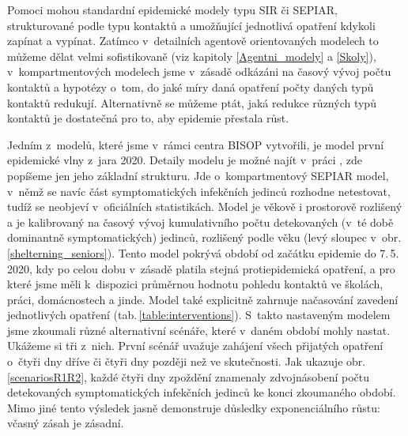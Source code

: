 Pomoci mohou standardní epidemické modely typu SIR či SEPIAR, strukturované podle typu kontaktů a umožňující jednotlivá opatření kdykoli zapínat a vypínat. Zatímco v~detailních agentově orientovaných modelech to můžeme dělat velmi sofistikovaně (viz kapitoly \ref{Agentni_modely} a \ref{Skoly}), v~kompartmentových modelech jsme v~zásadě odkázáni na časový vývoj počtu kontaktů a hypotézy o~tom, do jaké míry daná opatření počty daných typů kontaktů redukují. Alternativně se můžeme ptát, jaká redukce různých typů kontaktů je dostatečná pro to, aby epidemie přestala růst.   

Jedním z~modelů, které jsme v~rámci centra BISOP vytvořili, je model první epidemické vlny z~jara 2020. Detaily modelu je možné najít v~práci \cite{Berec_modelB}, zde popíšeme jen jeho základní strukturu. Jde o~kompartmentový SEPIAR model, v~němž se navíc část symptomatických infekčních jedinců rozhodne netestovat, tudíž se neobjeví v~oficiálních statistikách. Model je věkově i prostorově rozlišený a je kalibrovaný na časový vývoj kumulativního počtu detekovaných (v~té době dominantně symptomatických) jedinců, rozlišený podle věku (levý sloupec v~obr.\,\ref{shelterning_seniors}). Tento model pokrývá období od začátku epidemie do 7.\,5.\,2020, kdy po celou dobu v~zásadě platila stejná protiepidemická opatření, a pro které jsme měli k~dispozici průměrnou hodnotu pohledu kontaktů ve školách, práci, domácnostech a jinde. Model také explicitně zahrnuje načasování zavedení jednotlivých opatření (tab.\,\ref{table:interventions}). S~takto nastaveným modelem jsme zkoumali různé alternativní scénáře, které v~daném období mohly nastat. Ukážeme si tři z~nich. První scénář uvažuje zahájení všech přijatých opatření o~čtyři dny dříve či čtyři dny později než ve skutečnosti. Jak ukazuje obr.\,\ref{scenariosR1R2}, každé čtyři dny zpoždění znamenaly zdvojnásobení počtu detekovaných symptomatických infekčních jedinců ke konci zkoumaného období. Mimo jiné tento výsledek jasně demonstruje důsledky exponenciálního růstu: včasný zásah je zásadní. 

